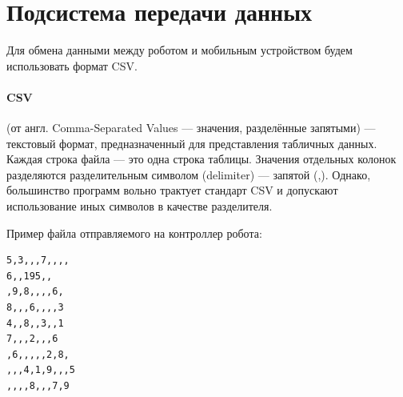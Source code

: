 \section{Подсистема передачи данных}

Для обмена данными между роботом и мобильным устройством будем использовать формат CSV.

\paragraph{CSV} (от англ. Comma-Separated Values — значения, разделённые запятыми) — текстовый формат, предназначенный для представления табличных данных. Каждая строка файла — это одна строка таблицы. Значения отдельных колонок разделяются разделительным символом (delimiter) — запятой (,). Однако, большинство программ вольно трактует стандарт CSV и допускают использование иных символов в качестве разделителя. 

Пример файла отправляемого на контроллер робота:
\begin{lstlisting}[caption=CSV файл с задание]
5,3,,,7,,,,
6,,195,,
,9,8,,,,6,
8,,,6,,,,3
4,,8,,3,,1
7,,,2,,,6
,6,,,,,2,8,
,,,4,1,9,,,5
,,,,8,,,7,9
\end{lstlisting}
